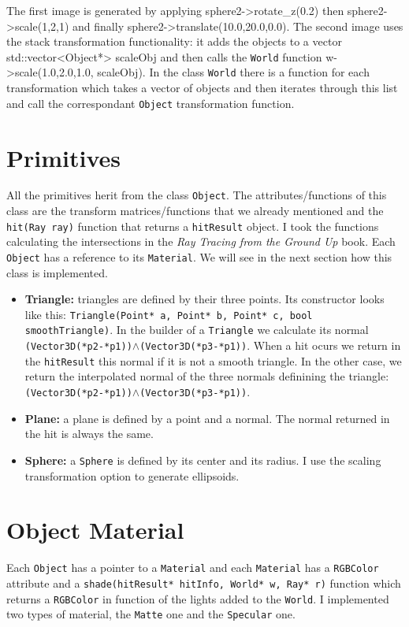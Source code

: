 \documentclass[a4paper,11.5pt]{article}
\theoremstyle{mytheor}
\begin{document}
The first image is generated by applying sphere2->rotate\_z(0.2)
then sphere2->scale(1,2,1) and finally sphere2->translate(10.0,20.0,0.0). The second image uses the stack transformation functionality: it adds the objects to a vector std::vector<Object*> scaleObj and then calls the \texttt{World} function w->scale(1.0,2.0,1.0, scaleObj). In the class \texttt{World} there is a function for each transformation which takes a vector of objects and then iterates through this list and call the correspondant \texttt{Object} transformation function.
\section{Primitives}
All the primitives herit from the class \texttt{Object}. The attributes/functions of this class are the transform matrices/functions that we already mentioned and the \texttt{hit(Ray ray)} function that returns a \texttt{hitResult} object. I took the functions calculating the intersections in the \textit{Ray Tracing from the Ground Up} book. Each \texttt{Object} has a reference to its \texttt{Material}. We will see in the next section how this class is implemented. 
\begin{itemize}
\item \textbf{Triangle:} triangles are defined by their three points. Its constructor looks like this: \texttt{Triangle(Point* a, Point* b, Point* c, bool smoothTriangle)}. In the builder of a \texttt{Triangle} we calculate its normal \texttt{(Vector3D(*p2-*p1))$\wedge$(Vector3D(*p3-*p1))}. When a hit ocurs we return in the \texttt{hitResult} this normal if it is not a smooth triangle. In the other case, we return the interpolated normal of the three normals definining the triangle: \texttt{(Vector3D(*p2-*p1))$\wedge$(Vector3D(*p3-*p1))}.
\item \textbf{Plane:} a plane is defined by a point and a normal. The normal returned in the hit is always the same.
\item\textbf{ Sphere: }a \texttt{Sphere} is defined by its center and its radius. I use the scaling transformation option to generate ellipsoids. 
\end{itemize}
\section{Object Material}
Each \texttt{Object} has a pointer to a \texttt{Material} and each \texttt{Material} has a \texttt{RGBColor} attribute and a \texttt{shade(hitResult* hitInfo, World* w, Ray* r)} function which returns a \texttt{RGBColor} in function of the lights added to the \texttt{World}. I implemented two types of material, the \texttt{Matte} one and the \texttt{Specular} one.
\end{document}

